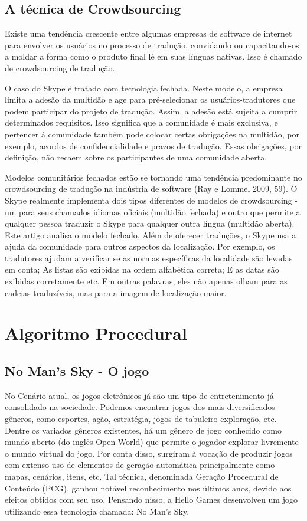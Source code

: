 \documentclass[12pt]{article}
\begin{document}
\subsection{A técnica de Crowdsourcing}

Existe uma tendência crescente entre algumas empresas de software de internet para envolver os usuários no processo de tradução, convidando ou capacitando-os a moldar a forma como o produto final lê em suas línguas nativas. Isso é chamado de crowdsourcing de tradução.

O caso do Skype é tratado com tecnologia fechada. Neste modelo, a empresa limita a adesão da multidão e age para pré-selecionar os usuários-tradutores que podem participar do projeto de tradução. Assim, a adesão está sujeita a cumprir determinados requisitos. Isso significa que a comunidade é mais exclusiva, e pertencer à comunidade também pode colocar certas obrigações na multidão, por exemplo, acordos de confidencialidade e prazos de tradução. Essas obrigações, por definição, não recaem sobre os participantes de uma comunidade aberta.

Modelos comunitários fechados estão se tornando uma tendência predominante no crowdsourcing de tradução na indústria de software (Ray e Lommel 2009, 59). O Skype realmente implementa dois tipos diferentes de modelos de crowdsourcing - um para seus chamados idiomas oficiais (multidão fechada) e outro que permite a qualquer pessoa traduzir o Skype para qualquer outra língua (multidão aberta). Este artigo analisa o modelo fechado. Além de oferecer traduções, o Skype usa a ajuda da comunidade para outros aspectos da localização. Por exemplo, os tradutores ajudam a verificar se as normas específicas da localidade são levadas em conta; As listas são exibidas na ordem alfabética correta; E as datas são exibidas corretamente etc. Em outras palavras, eles não apenas olham para as cadeias traduzíveis, mas para a imagem de localização maior.

\section{Algoritmo Procedural}

\subsection{No Man's Sky - O jogo}

No Cenário atual, os jogos eletrônicos já são um tipo de entretenimento já consolidado na sociedade. Podemos encontrar jogos dos mais diversificados gêneros, como esportes, ação, estratégia, jogos de tabuleiro exploração, etc. Dentre os variados gêneros existentes, há um gênero de jogo conhecido como mundo aberto (do inglês Open World) que permite o jogador explorar livremente o mundo virtual do jogo. Por conta disso, surgiram à vocação de produzir jogos com extenso uso de elementos de geração automática principalmente como mapas, cenários, itens, etc. Tal técnica, denominada Geração Procedural de Conteúdo (PCG), ganhou notável reconhecimento nos últimos anos, devido aos efeitos obtidos com seu uso. Pensando nisso, a Hello Games desenvolveu um jogo utilizando essa tecnologia chamada: No Man’s Sky.
\end{document}
